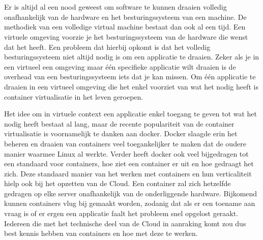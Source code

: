 
\chapter{}
\label{ch:inleiding}


Er is altijd al een nood geweest om software te kunnen draaien volledig onafhankelijk van de hardware en het besturingssysteem van een machine. De methodiek van een volledige virtual machine bestaat dan ook al een tijd. Een virtuele omgeving voorzie je het besturingssysteem van de hardware die wenst dat het heeft. Een probleem dat hierbij opkomt is dat het volledig besturingssysteem niet altijd nodig is om een applicatie te draaien.  Zeker als je in een virtueel een omgeving maar één specifieke applicatie wilt draaien is de overhead van een besturingssysteem iets dat je kan missen.  Om één applicatie te draaien in een virtueel omgeving die het enkel voorziet van wat het nodig heeft is container virtualisatie in het leven geroepen.
 
Het idee om in virtuele context een applicatie enkel toegang te geven tot wat het nodig heeft bestaat al lang, maar de recente populariteit van de container virtualisatie is voornamelijk te danken aan docker.  Docker slaagde erin het beheren en draaien van containers veel toegankelijker te maken dat de oudere manier waarmee Linux al werkte.  Verder heeft docker ook veel bijgedragen tot een standaard voor containers, hoe ziet een container er uit en hoe gedraagt het zich.  Deze standaard manier van het werken met containers en hun verticaliteit hielp ook bij het opzetten van de Cloud. Een container zal zich hetzelfde gedragen op elke server onafhankelijk van de onderliggende hardware. Bijkomend kunnen containers vlug bij gemaakt worden, zodanig dat als er een toename aan vraag is of er ergen een applicatie faalt het probleem snel opgelost geraakt. Iedereen die met het technische deel van de Cloud in aanraking komt zou dus best kennis hebben van containers en hoe met deze te werken.


\section{}
\label{sec:probleemstelling}

